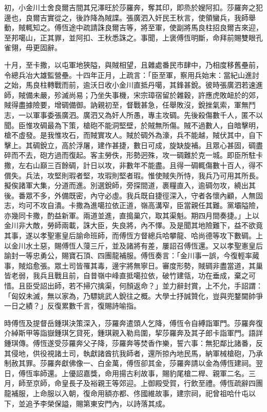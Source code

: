 \begin{pinyinscope}
初，小金川土舍良爾吉間其兄澤旺於莎羅奔，奪其印，即烝於嫂阿扣。莎羅奔之犯邊也，良爾吉實從之，後詐降為賊諜。張廣泗入奸民王秋言，使領蠻兵，我師舉動，賊輒知之。傅恆途中疏請誅良爾吉等，將至軍，使副將馬良柱招良爾吉來迎，至邦噶山，正其罪，並阿扣、王秋悉誅之。事聞，上褒傅恆明斷，命拜前賜雙眼孔雀翎，毋更固辭。

十月，至卡撒，以屯軍地狹隘，與賊相望，且雜處番民巿肆中，乃相度移舊壘前，令總兵冶大雄監營壘。十四年正月，上疏言：「臣至軍，察用兵始末：當紀山進討之始，馬良柱轉戰而前，逾沃日收小金川直抵丹噶，其鋒甚銳。彼時張廣泗若速進師，賊備未嚴，殄滅尚易；乃坐失事機，宋宗璋宿留於雜穀，許應虎敗衄於的郊，賊得盡據險要，增碉備御。訥親初至，督戰甚急，任舉敗沒，銳挫氣索，軍無鬥志，一以軍事委張廣泗。廣泗又為奸人所愚，專主攻碉。先後殺傷數千人，匿不以聞。臣惟攻碉最為下策，槍砲不能洞堅壁，於賊無所傷。賊不過數人，自暗擊明，槍不虛發。是我惟攻石，而賊實攻人。賊於碉外為濠，兵不能越，賊伏其中，自下擊上。其碉銳立，高於浮屠，建作甚捷，數日可成，旋缺旋補。且眾心甚固，碉盡碎而不去，砲方過而復起。客主勞佚，形勢迥殊，攻一碉難於克一城。即臣所駐卡撒，左右山巔三百餘碉，計日以攻，非數年不能盡。且得一碉輒傷數十百人，得不償失。兵法，攻堅則瑕者堅，攻瑕則堅者瑕。惟使賊失所恃，我兵乃可用其所長。擬俟諸軍大集，分道而進。別選銳師，旁探間道，裹糧直入，逾碉勿攻，繞出其後。番眾不多，外備既密，內守必虛。我兵既自捷徑深入，守者各懷內顧，人無固志，均可不攻自潰。卡撒為進噶拉依正道，嶺高溝窄，臣當親任其難。黨壩隘險，亦幾同卡撒，酌益新軍。兩道並進，直搗巢穴，取其渠魁。期四月間奏捷。」上以金川非大敵，勞師兩載，誅大臣，失良將，內不懌。及是聞其地險難下，益不欲竟其事，遂以孝聖憲皇后諭命班師，而傅恆方督總兵哈攀龍、哈尚德等攻下數碉。上以金川水土惡，賜傅恆人蓡三斤，並及諸將有差，屢詔召傅恆還。又以孝聖憲皇后諭封一等忠勇公，賜寶石頂、四團龍補服。傅恆奏言：「金川事一誤，今復輕率蕆事，賊焰愈張。眾土司皆罹其毒，邊宇將無寧日。審度形勢，賊碉非盡當道，其巢皆老弱，我兵且戰且前，自昔嶺中峰直抵噶拉依，破竹建瓴，功在垂成，棄之可惜。且臣受詔出師，若不掃穴擒渠，何顏返命？」並力辭封賞，上不允，手詔謂：「匈奴未滅，無以家為，乃驃姚武人銳往之概。大學士抒誠贊化，豈與兜鍪閫帥爭一日之績？」反復累數千言，復賜詩喻指。

時傅恆及提督岳鍾琪決策深入，莎羅奔遣頭人乞降，傅恆令自縛詣軍門。莎羅奔復介綽斯甲等詣嶽鍾琪乞貸死，鍾琪親入勒烏圍，挈莎羅奔及其子郎卡詣軍門。語詳鍾琪傳。傅恆遂受莎羅奔父子降，莎羅奔等焚香作樂，誓六事：無犯鄰比諸番，反其侵地，供役視諸土司，執獻諸酋抗我師者，還所掠內地民馬，納軍械槍砲，乃承制赦其罪。莎羅奔獻佛像一、白金萬，傅恆卻其金，莎羅奔請以金為傅恆建祠。翌日，傅恆率師還。上優詔嘉獎，命用揚古利故事，賜豹尾槍二桿、親軍二名。三月，師至京師，命皇長子及裕親王等郊迎。上御殿受賀，行飲至禮。傅恆疏辭四團龍補服，上命服以入朝，復命用額亦都、佟國維故事，建宗祠，祀曾祖哈什屯以下，並追予李榮保謚，賜第東安門內，以詩落其成。


\end{pinyinscope}
